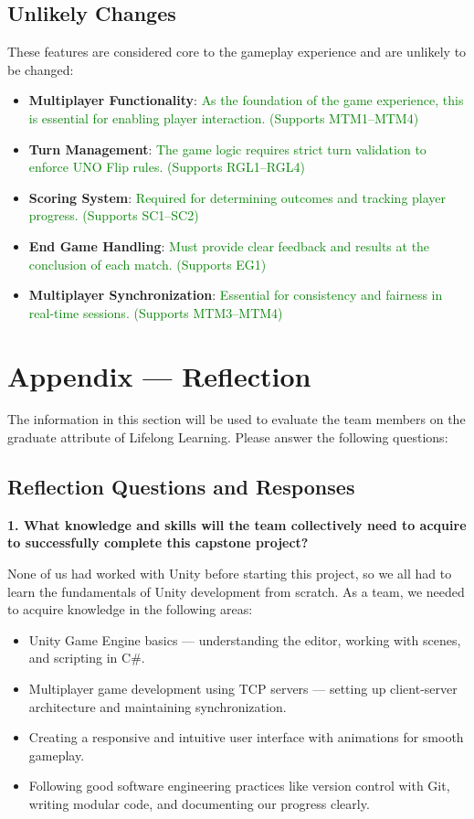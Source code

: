 \documentclass[12pt]{article}
\newcommand{\added}[1]{\textcolor{green}{#1}}
\begin{document}
\subsection{Unlikely Changes}
These features are considered core to the gameplay experience and are unlikely to be changed:
\begin{itemize}
    \item \textbf{Multiplayer Functionality}: \added{As the foundation of the game experience, this is essential for enabling player interaction. (Supports MTM1–MTM4)}
    
    \item \textbf{Turn Management}: \added{The game logic requires strict turn validation to enforce UNO Flip rules. (Supports RGL1–RGL4)}
    
    \item \textbf{Scoring System}: \added{Required for determining outcomes and tracking player progress. (Supports SC1–SC2)}
    
    \item \textbf{End Game Handling}: \added{Must provide clear feedback and results at the conclusion of each match. (Supports EG1)}
    
    \item \textbf{Multiplayer Synchronization}: \added{Essential for consistency and fairness in real-time sessions. (Supports MTM3–MTM4)}
\end{itemize}

\section{Appendix — Reflection}
The information in this section will be used to evaluate the team members on the graduate attribute of Lifelong Learning. Please answer the following questions:

\subsection{Reflection Questions and Responses}

\textbf{1. What knowledge and skills will the team collectively need to acquire to successfully complete this capstone project?}

None of us had worked with Unity before starting this project, so we all had to learn the fundamentals of Unity development from scratch. As a team, we needed to acquire knowledge in the following areas:
\begin{itemize}
    \item Unity Game Engine basics — understanding the editor, working with scenes, and scripting in C#.
    \item Multiplayer game development using TCP servers — setting up client-server architecture and maintaining synchronization.
    \item Creating a responsive and intuitive user interface with animations for smooth gameplay.
    \item Following good software engineering practices like version control with Git, writing modular code, and documenting our progress clearly.
\end{itemize}
\end{document}
